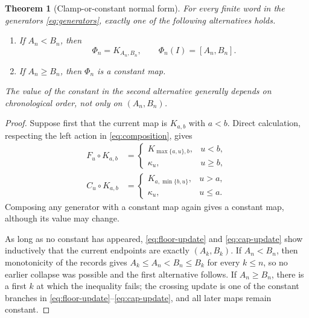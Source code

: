 \documentclass[11pt,a4paper]{amsart}
\newtheorem{theorem}{Theorem}[section]
\theoremstyle{definition}
\theoremstyle{remark}
\begin{document}
\begin{theorem}[Clamp-or-constant normal form]\label{thm:normal}
For every finite word in the generators \eqref{eq:generators}, exactly one
of the following alternatives holds.
\begin{enumerate}
\item If $A_n<B_n$, then
      \[
        \Phi_n=K_{A_n,B_n},\qquad
        \Phi_n(I)=[A_n,B_n].
      \]
\item If $A_n\geq B_n$, then $\Phi_n$ is a constant map.
\end{enumerate}
The value of the constant in the second alternative generally depends on
chronological order, not only on $(A_n,B_n)$.
\end{theorem}

\begin{proof}
Suppose first that the current map is $K_{a,b}$ with $a<b$.  Direct
calculation, respecting the left action in \eqref{eq:composition}, gives
\begin{align}
 F_u\circ K_{a,b}
   &=\begin{cases}K_{\max\{a,u\},b},&u<b,\\
                    \kappa_u,&u\geq b,
     \end{cases}                                      \label{eq:floor-update}\\
 C_u\circ K_{a,b}
   &=\begin{cases}K_{a,\min\{b,u\}},&u>a,\\
                    \kappa_u,&u\leq a.
     \end{cases}                                      \label{eq:cap-update}
\end{align}
Composing any generator with a constant map again gives a constant map,
although its value may change.

As long as no constant has appeared, \eqref{eq:floor-update} and
\eqref{eq:cap-update} show inductively that the current endpoints are
exactly $(A_k,B_k)$.  If $A_n<B_n$, then monotonicity of the records gives
$A_k\leq A_n<B_n\leq B_k$ for every $k\leq n$, so no earlier collapse was
possible and the first alternative follows.  If $A_n\geq B_n$, there is a
first $k$ at which the inequality fails; the crossing update is one of the
constant branches in \eqref{eq:floor-update}--\eqref{eq:cap-update}, and
all later maps remain constant.
\end{proof}
\end{document}
